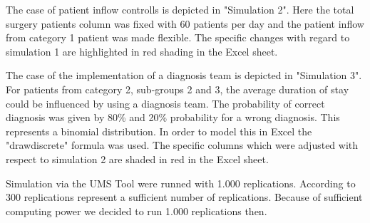 The case of patient inflow controlls is depicted in "Simulation 2". Here the total surgery patients column was fixed with 60 patients per day and the patient inflow from category 1 patient was made flexible. The specific changes with regard to simulation 1 are highlighted in red shading in the Excel sheet.

The case of the implementation of a diagnosis team is depicted in "Simulation 3". For patients from category 2, sub-groups 2 and 3, the average duration of stay could be influenced by using a diagnosis team. The probability of correct diagnosis was given by 80\% and 20\% probability for a wrong diagnosis. This represents a binomial distribution. In order to model this in Excel the "drawdiscrete" formula was used. The specific columns which were adjusted with respect to simulation 2 are shaded in red in the Excel sheet.

Simulation via the UMS Tool were runned with 1.000 replications. According to \cite[p.501 f.]{ragsdale} 300 replications represent a sufficient number of replications. Because of sufficient computing power we decided to run 1.000 replications then.